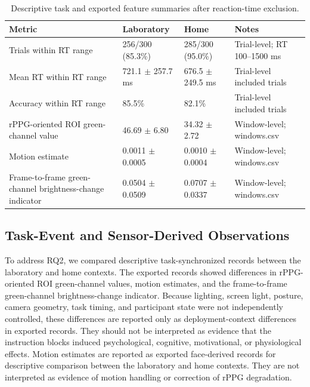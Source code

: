 \documentclass[dvipdfmx]{ehis}
\begin{document}
\begin{table}[t]
\centering
\caption{Descriptive task and exported feature summaries after reaction-time exclusion.}
\label{tab:data_quality}
\footnotesize
\begin{tabular}{@{}p{}p{}p{}p{}@{}}
\toprule
\textbf{Metric} & \textbf{Laboratory} & \textbf{Home} & \textbf{Notes} \\
\midrule
Trials within RT range & 256/300 (85.3\%) & 285/300 (95.0\%) & Trial-level; RT 100--1500 ms \\
Mean RT within RT range & 721.1 $\pm$ 257.7 ms & 676.5 $\pm$ 249.5 ms & Trial-level included trials \\
Accuracy within RT range & 85.5\% & 82.1\% & Trial-level included trials \\
rPPG-oriented ROI green-channel value & 46.69 $\pm$ 6.80 & 34.32 $\pm$ 2.72 & Window-level; windows.csv \\
Motion estimate & 0.0011 $\pm$ 0.0005 & 0.0010 $\pm$ 0.0004 & Window-level; windows.csv \\
Frame-to-frame green-channel brightness-change indicator & 0.0504 $\pm$ 0.0509 & 0.0707 $\pm$ 0.0337 & Window-level; windows.csv \\
\bottomrule
\end{tabular}
\end{table}

\subsection{Task-Event and Sensor-Derived Observations}
To address RQ2, we compared descriptive task-synchronized records between the laboratory and home contexts.
The exported records showed differences in rPPG-oriented ROI green-channel values, motion estimates, and the frame-to-frame green-channel brightness-change indicator.
Because lighting, screen light, posture, camera geometry, task timing, and participant state were not independently controlled, these differences are reported only as deployment-context differences in exported records.
They should not be interpreted as evidence that the instruction blocks induced psychological, cognitive, motivational, or physiological effects.
Motion estimates are reported as exported face-derived records for descriptive comparison between the laboratory and home contexts.
They are not interpreted as evidence of motion handling or correction of rPPG degradation.
\end{document}
